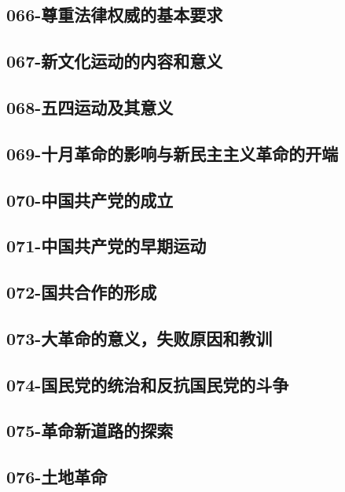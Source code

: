 \subsection{066-尊重法律权威的基本要求}

\subsection{067-新文化运动的内容和意义}

\subsection{068-五四运动及其意义}

\subsection{069-十月革命的影响与新民主主义革命的开端}

\subsection{070-中国共产党的成立}

\subsection{071-中国共产党的早期运动}

\subsection{072-国共合作的形成}

\subsection{073-大革命的意义，失败原因和教训}

\subsection{074-国民党的统治和反抗国民党的斗争}

\subsection{075-革命新道路的探索}

\subsection{076-土地革命}

